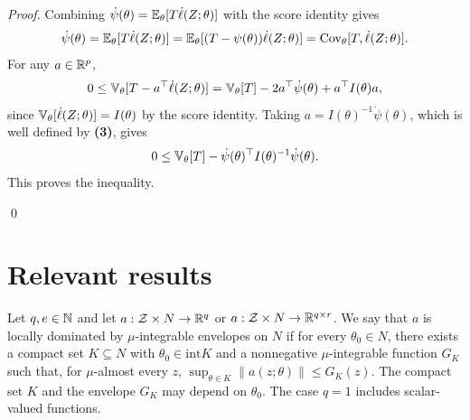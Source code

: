 \begin{proof}
   Combining $\dot \psi(\theta) = \mathbb{E}_{\theta}[T \dot\ell(Z;\theta)]$ with the score identity gives
   \[ 
     \dot \psi(\theta) = \mathbb{E}_{\theta}[T \dot \ell(Z;\theta)] =
     \mathbb{E}_{\theta}[(T-\psi(\theta))\dot\ell(Z;\theta)] = \operatorname{Cov}_{\theta}[T,\dot\ell(Z;\theta)]
   .\]
   For any $a \in \mathbb{R}^{p}$, 
   \[ 
     0 \le \mathbb{V}_{\theta}[T-a^{\top }\dot\ell(Z;\theta)] = \mathbb{V}_{\theta}[T] - 2a^{\top }\dot\psi(\theta)
     + a^{\top }I(\theta) a
   ,\]
   since $\mathbb{V}_{\theta}[\dot\ell(Z;\theta)] = I(\theta)$ by the score identity. Taking $a =
   I(\theta)^{-1}\dot\psi(\theta)$, which is well defined by \textbf{(3)}, gives
   \[ 
     0 \le \mathbb{V}_{\theta}[T] - \dot\psi(\theta)^{\top }I(\theta)^{-1}\dot\psi(\theta)
   .\]
   This proves the inequality.

\qed
\end{proof}


\section{Relevant results}
\begin{definition*}
  Let $q,e \in \mathbb{N}$ and let $a: \mathcal{Z} \times  N \to \mathbb{R}^{q} $ or $a:\mathcal{Z} \times  N \to
  \mathbb{R}^{q\times r}$. We say that $a$ is locally dominated by $\mu$-integrable envelopes on $N$ if for
  every $\theta_0 \in N$, there exists a compact set $K \subseteq  N$ with $\theta_0 \in
  \mathrm{int} K$ and a nonnegative $\mu$-integrable function $G_K$ such that, for $\mu$-almost
  every $z$, $\sup_{\theta \in K} \| a(z;\theta) \|\le G_K(z)$. The compact set $K$ and the envelope
  $G_K$ may depend on $\theta_0$. The case $q=1$ includes scalar-valued functions.
\end{definition*}

